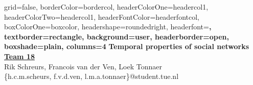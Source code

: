 \documentclass[archE1,portrait]{baposter}
\begin{document}
\background{ %

}

\begin{poster}{
grid=false,
borderColor=bordercol, %
headerColorOne=headercol1, %
headerColorTwo=headercol1, %
headerFontColor=headerfontcol, %
boxColorOne=boxcolor, %
headershape=roundedright, %
headerfont=\Large\sf\bf, %
textborder=rectangle,
background=user,
headerborder=open, %
boxshade=plain,
columns=4
}
{}
%
%
{
\sf\bf Temporal properties of social networks} %
{
\vspace{1em} {\LARGE\bf \underline{Team 18}}\\
Rik Schreurs, Francois van der Ven, Loek Tonnaer\\ %
{\smaller \{h.c.m.scheurs, f.v.d.ven, l.m.a.tonnaer\}@student.tue.nl}\\
\vspace{1em}
} %
%


\end{poster}
\end{document}
